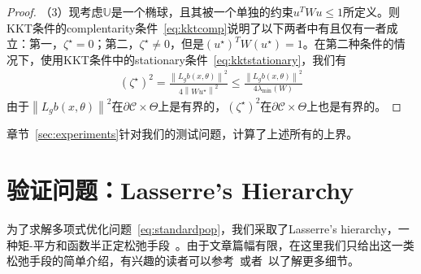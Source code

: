 \begin{proof}
    （3）现考虑$\mathbb{U}$是一个椭球，且其被一个单独的约束$u^T W u \le 1$所定义。则KKT条件的complentarity条件~\eqref{eq:kktcomp}说明了以下两者中有且仅有一者成立：第一，$\zeta^\star=0$；第二，$\zeta^\star \ne 0$，但是$(u^\star)^T W (u^\star) = 1$。在第二种条件的情况下，使用KKT条件中的stationary条件~\eqref{eq:kktstationary}，我们有
    \begin{eqnarray}
      (\zeta^\star)^2 = \frac{
        \left\lVert L_gb(x, \theta) \right\rVert^2
      }{4 \left\lVert W u^\star \right\rVert^2} 
      \le \frac{
        \left\lVert L_gb(x, \theta) \right\rVert^2
      }{4 \lambda_{\min}(W)} 
    \end{eqnarray}
    由于$\left\lVert L_gb(x, \theta) \right\rVert^2$在$\partial \mathcal{C} \times \Theta$上是有界的，$(\zeta^\star)^2$在$\partial \mathcal{C} \times \Theta$上也是有界的。
  \end{proof}

章节~\ref{sec:experiments}针对我们的测试问题，计算了上述所有的上界。

\section{验证问题：Lasserre's Hierarchy}
\label{sec:sdpverify}

为了求解多项式优化问题~\eqref{eq:standardpop}，我们采取了Lasserre's hierarchy，一种矩-平方和函数半正定松弛手段~\cite{lasserre01siopt-global}。由于文章篇幅有限，在这里我们只给出这一类松弛手段的简单介绍，有兴趣的读者可以参考~\cite{lasserre01siopt-global}或者~\cite{yang22pami-certifiably}以了解更多细节。

